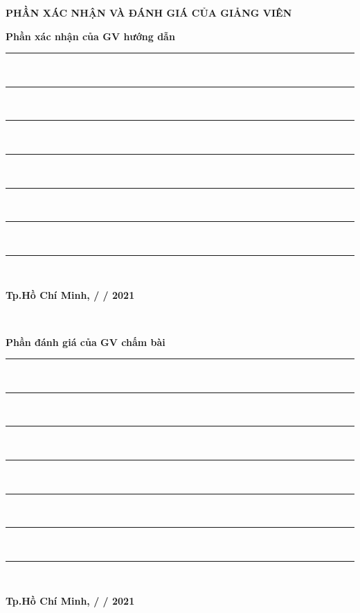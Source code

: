 \begin{flushleft}
    \textbf{\large PHẦN XÁC NHẬN VÀ ĐÁNH GIÁ CỦA GIẢNG VIÊN}\\[1cm]
\end{flushleft}

\begin{flushleft}
    \textbf{\large Phần xác nhận của GV hướng dẫn}\\[1cm]
\end{flushleft}
\rule{\linewidth}{0.2 mm} \\
\rule{\linewidth}{0.2 mm} \\
\rule{\linewidth}{0.2 mm} \\
\rule{\linewidth}{0.2 mm} \\
\rule{\linewidth}{0.2 mm} \\
\rule{\linewidth}{0.2 mm} \\
\rule{\linewidth}{0.2 mm} \\
\begin{flushright}
    \textbf{\large Tp.Hồ Chí Minh,  /   / 2021}\\[0cm]
\end{flushright}
\begin{flushright}
    \\[0cm]
\end{flushright}
\vspace{2.45cm}
\begin{flushleft}
    \textbf{\large Phần đánh giá của GV chấm bài}\\[1cm]
\end{flushleft}
\rule{\linewidth}{0.2 mm} \\
\rule{\linewidth}{0.2 mm} \\
\rule{\linewidth}{0.2 mm} \\
\rule{\linewidth}{0.2 mm} \\
\rule{\linewidth}{0.2 mm} \\
\rule{\linewidth}{0.2 mm} \\
\rule{\linewidth}{0.2 mm} \\
\begin{flushright}
    \textbf{\large Tp.Hồ Chí Minh,  /   / 2021}\\[0cm]
\end{flushright}
\begin{flushright}
    \\[0cm]
\end{flushright}
\vspace{25cm}